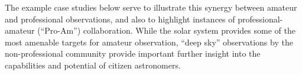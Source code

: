 \documentclass{ar2e}
\begin{document}
The example case studies below serve to illustrate this synergy between amateur
and professional observations, and also to highlight instances of
professional-amateur (``Pro-Am'') collaboration. While the solar system provides
some of the most amenable targets for amateur observation, ``deep sky''
observations by the non-professional community provide important further insight
into the capabilities and potential of citizen astronomers.



% 
% 
% 
%  
% 
% 
\end{document}
